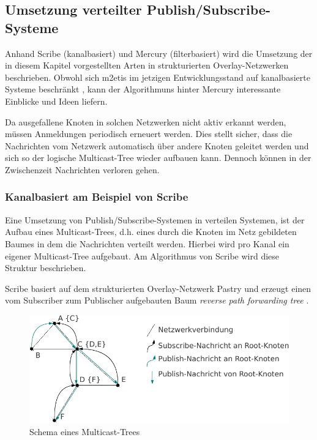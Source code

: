 \subsection{Umsetzung verteilter Publish/Subscribe-Systeme}
Anhand Scribe (kanalbasiert) \cite{Castro2002Scribe} und Mercury (filterbasiert) \cite{Bharambe2004Mercury} wird die Umsetzung der in diesem Kapitel vorgestellten Arten in strukturierten Overlay-Netzwerken beschrieben. Obwohl sich \ac{m2etis} im jetzigen Entwicklungsstand auf kanalbasierte Systeme beschränkt \cite{Fischer2010a}, kann der Algorithmuns hinter Mercury interessante Einblicke und Ideen liefern.

Da ausgefallene Knoten in solchen Netzwerken nicht aktiv erkannt werden, müssen Anmeldungen periodisch erneuert werden. Dies stellt sicher, dass die Nachrichten vom Netzwerk automatisch über andere Knoten geleitet werden und sich so der logische Multicast-Tree wieder aufbauen kann. Dennoch können in der Zwischenzeit Nachrichten verloren gehen.

\subsubsection*{Kanalbasiert am Beispiel von Scribe}
\label{chap:related:scribe}
Eine Umsetzung von Publish/Subscribe-Systemen in verteilen Systemen, ist der Aufbau eines Multicast-Trees, d.h. eines durch die Knoten im Netz gebildeten Baumes in dem die Nachrichten verteilt werden. Hierbei wird pro Kanal ein eigener Multicast-Tree aufgebaut. Am Algorithmus von Scribe wird diese Struktur beschrieben.

Scribe basiert auf dem strukturierten Overlay-Netzwerk Pastry \cite{Rowstron2001} und erzeugt einen vom Subscriber zum Publischer aufgebauten Baum \emph{reverse path forwarding tree} \cite{Dalal1978}.

\begin{figure}[htbp]
\centering
\includegraphics{grafics/multicast_tree.pdf}
\caption{Schema eines Multicast-Trees}
\label{fig:multicast_tree}
\end{figure}

